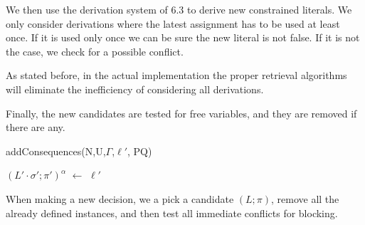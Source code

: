 \documentclass[a4paper]{article}
\begin{document}
We then use the derivation system of 6.3 to derive new constrained literals. We only consider derivations 
where the latest assignment has to be used at least once. If it is used only once we can be sure the new 
literal is not false. If it is not the case, we check for a possible conflict.

As stated before, in the actual implementation the proper retrieval algorithms will eliminate the inefficiency of considering all derivations.

Finally, the new candidates are tested for free variables, and they are removed if there are any.
\begin{function}
	
	\caption{addConsequences(N,U,$\Gamma$,$\ell'$, PQ)}
$(L'\cdot\sigma'; \pi')^\alpha$ $\gets$ $\ell'$\;
	\;
	\;
\end{function}
When making a new decision, we a pick a candidate $(L; \pi)$, 
remove all the already defined instances, and then 
test all immediate conflicts for blocking. 
\end{document}
